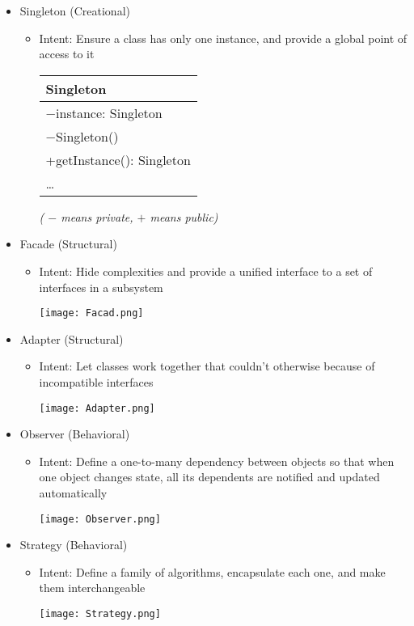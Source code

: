 \begin{itemize}
	\item Singleton (Creational)
	\begin{itemize}
		\item Intent: Ensure a class has only one instance, and provide a global point of access to it\\
		\begin{center}
			\begin{tabular}{| l |}
				\hline
				Singleton\\
				\hline
				$ - $instance: Singleton\\
				\hline
				$ - $Singleton()\\
				+getInstance(): Singleton\\
				\ldots\\
				\hline
			\end{tabular}	\textit{	( $ - $ means private, $ + $ means public)}
		\end{center}
	\end{itemize}
	\item Facade (Structural)
	\begin{itemize}
		\item Intent: Hide complexities and provide a unified interface to a set of interfaces in a subsystem\\[-10pt]
		\begin{center}
			\texttt{[image: Facad.png]}
		\end{center}
	\end{itemize}
	\item Adapter (Structural)
	\begin{itemize}
		\item Intent: Let classes work together that couldn't otherwise because of incompatible interfaces\\[-10pt]
		\begin{center}
			\texttt{[image: Adapter.png]}
		\end{center}
	\end{itemize}

	\item Observer (Behavioral)
	\begin{itemize}
		\item Intent: Define a one-to-many dependency between objects so that when one object changes state, all its dependents are notified and updated automatically\\[-10pt]
		\begin{center}
			\texttt{[image: Observer.png]}
		\end{center}
	\end{itemize}
	\item Strategy (Behavioral)
	\begin{itemize}
		\item Intent: Define a family of algorithms, encapsulate each one, and make them interchangeable\\[-10pt]
		\begin{center}
			\texttt{[image: Strategy.png]}
		\end{center}
	\end{itemize}
\end{itemize}
